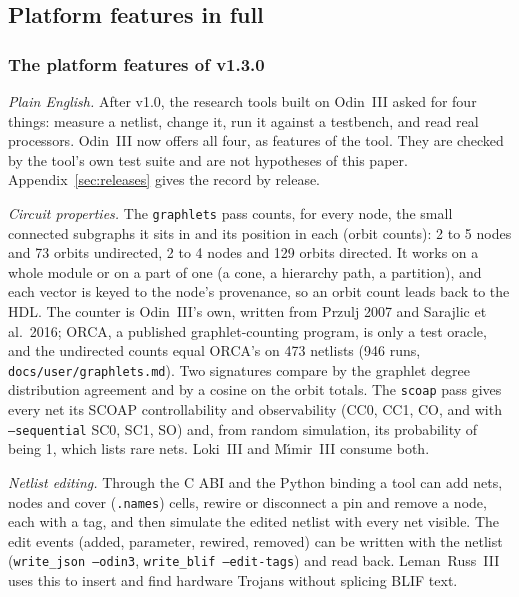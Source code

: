 \documentclass[conference]{IEEEtran}
\newcommand{\code}[1]{\texttt{#1}}
\begin{document}
\subsection{Platform features in full}

\subsubsection*{The platform features of v1.3.0}


\emph{Plain English.} After v1.0, the research tools built on Odin~III asked for four things: measure a netlist, change it, run it against a testbench, and read real processors. Odin~III now offers all four, as features of the tool. They are checked by the tool's own test suite and are not hypotheses of this paper. Appendix~\ref{sec:releases} gives the record by release.

\emph{Circuit properties.} The \code{graphlets} pass counts, for every node, the small connected subgraphs it sits in and its position in each (orbit counts): 2 to 5 nodes and 73 orbits undirected, 2 to 4 nodes and 129 orbits directed. It works on a whole module or on a part of one (a cone, a hierarchy path, a partition), and each vector is keyed to the node's provenance, so an orbit count leads back to the HDL. The counter is Odin~III's own, written from Przulj 2007 and Sarajlic et al.\ 2016; ORCA, a published graphlet-counting program, is only a test oracle, and the undirected counts equal ORCA's on 473 netlists (946 runs, \code{docs/user/graphlets.md}). Two signatures compare by the graphlet degree distribution agreement and by a cosine on the orbit totals. The \code{scoap} pass gives every net its SCOAP controllability and observability (CC0, CC1, CO, and with \code{--sequential} SC0, SC1, SO) and, from random simulation, its probability of being 1, which lists rare nets. Loki~III and M\'{\i}mir~III consume both.

\emph{Netlist editing.} Through the C ABI and the Python binding a tool can add nets, nodes and cover (\code{.names}) cells, rewire or disconnect a pin and remove a node, each with a tag, and then simulate the edited netlist with every net visible. The edit events (added, parameter, rewired, removed) can be written with the netlist (\code{write\_json --odin3}, \code{write\_blif --edit-tags}) and read back. Leman~Russ~III uses this to insert and find hardware Trojans without splicing BLIF text.
\end{document}
